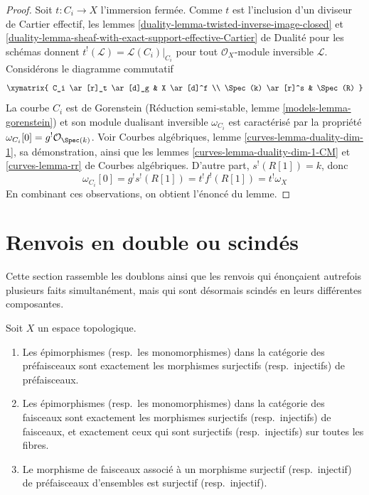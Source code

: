 \begin{proof}
Soit $t : C_i \to X$ l'immersion fermée. Comme $t$ est l'inclusion d'un
diviseur de Cartier effectif, les lemmes
\ref{duality-lemma-twisted-inverse-image-closed} et
\ref{duality-lemma-sheaf-with-exact-support-effective-Cartier}
de Dualité pour les schémas donnent
$t^!(\mathcal{L}) = \mathcal{L}(C_i)|_{C_i}$ pour tout
$\mathcal{O}_X$-module inversible $\mathcal{L}$.
Considérons le diagramme commutatif
$$
\xymatrix{
C_i \ar[r]_t \ar[d]_g & X \ar[d]^f \\
\Spec(k) \ar[r]^s & \Spec(R)
}
$$
La courbe $C_i$ est de Gorenstein (Réduction semi-stable, lemme
\ref{models-lemma-gorenstein}) et son module dualisant inversible
$\omega_{C_i}$ est caractérisé par la propriété
$\omega_{C_i}[0] = g^!\mathcal{O}_{\Spec(k)}$. Voir Courbes algébriques,
lemme \ref{curves-lemma-duality-dim-1}, sa démonstration, ainsi que les lemmes
\ref{curves-lemma-duality-dim-1-CM} et \ref{curves-lemma-rr}
de Courbes algébriques.
D'autre part, $s^!(R[1]) = k$, donc
$$
\omega_{C_i}[0] =
g^! s^!(R[1]) = t^!f^!(R[1]) = t^!\omega_X
$$
En combinant ces observations, on obtient l'énoncé du lemme.
\end{proof}






\section{Renvois en double ou scindés}
\label{section-duplicates}

\noindent
Cette section rassemble les doublons ainsi que les renvois qui énonçaient
autrefois plusieurs faits simultanément, mais qui sont désormais scindés en
leurs différentes composantes.

\begin{lemma}
\label{lemma-characterize-epi-mono}
Soit $X$ un espace topologique.
\begin{enumerate}
\item Les épimorphismes (resp.\ les monomorphismes) dans la catégorie des
préfaisceaux sont exactement les morphismes surjectifs (resp.\ injectifs) de
préfaisceaux.
\item Les épimorphismes (resp.\ les monomorphismes) dans la catégorie des
faisceaux sont exactement les morphismes surjectifs (resp.\ injectifs) de
faisceaux, et exactement ceux qui sont surjectifs (resp.\ injectifs) sur
toutes les fibres.
\item Le morphisme de faisceaux associé à un morphisme surjectif
(resp.\ injectif) de préfaisceaux d'ensembles est surjectif
(resp.\ injectif).
\end{enumerate}
\end{lemma}

